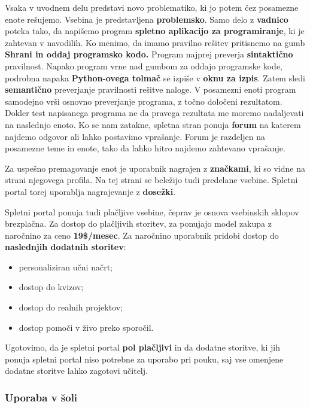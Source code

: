 Vsaka v uvodnem delu predstavi novo problematiko, ki jo potem čez
posamezne enote rešujemo. Vsebina je predstavljena
\textbf{problemsko}. Samo delo z \textbf{vadnico} poteka tako, da
napišemo program \textbf{spletno aplikacijo za programiranje}, ki je
zahtevan v navodilih. Ko menimo, da imamo pravilno rešitev pritisnemo
na gumb \textbf{Shrani in oddaj programsko kodo.} Program najprej
preverja \textbf{sintaktično} pravilnost. Napako program vrne nad
gumbom za oddajo programske kode, podrobna napaka \textbf{Python-ovega
  tolmač} se izpiše v \textbf{oknu za izpis}. Zatem sledi
\textbf{semantično} preverjanje pravilnosti rešitve naloge. V
posamezni enoti program samodejno vrši osnovno preverjanje programa, z
točno določeni rezultatom. Dokler test napisanega programa ne da
pravega rezultata me moremo nadaljevati na naslednjo enoto. Ko se nam
zatakne, spletna stran ponuja \textbf{forum} na katerem najdemo
odgovor ali lahko postavimo vprašanje. Forum je razdeljen na posamezne
teme in enote, tako da lahko hitro najdemo zahtevano vprašanje.

Za uspešno premagovanje enot je uporabnik nagrajen z
\textbf{značkami}, ki so vidne na strani njegovega profila. Na tej
strani se beležijo tudi predelane vsebine. Spletni portal torej
uporablja nagrajevanje z \textbf{dosežki}.

Spletni portal ponuja tudi plačljive vsebine, čeprav je osnova
vsebinskih sklopov brezplačna. Za dostop do plačljivih storitev, za
ponujajo model zakupa z naročnino za ceno \textbf{19\$/mesec}. Za
naročnino uporabnik pridobi dostop do\textbf{ naslednjih dodatnih
  storitev}:

\begin{itemize}
\item personaliziran učni načrt;
\item dostop do kvizov;
\item dostop do realnih projektov;
\item dostop pomoči v živo preko sporočil.
\end{itemize}

Ugotovimo, da je spletni portal \textbf{pol plačljivi} in da dodatne
storitve, ki jih ponuja spletni portal niso potrebne za uporabo pri
pouku, saj vse omenjene dodatne storitve lahko zagotovi učitelj.

\subsubsection{Uporaba v šoli}
\label{sec:uporaba_v_soli}

